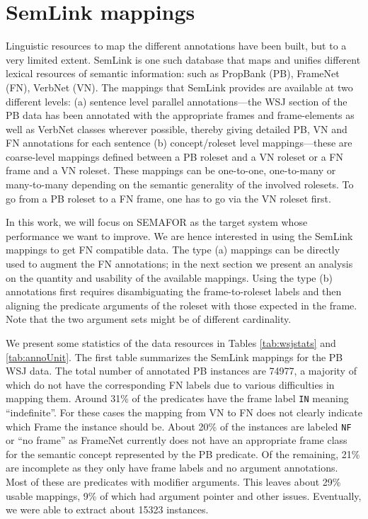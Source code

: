 \documentclass[11pt]{article}
\begin{document}
\section{SemLink mappings}\label{sec:semlink}

Linguistic resources to map the different annotations have been built, but to a very limited extent. SemLink \citep{semlink} is one such database that maps and unifies different lexical resources of semantic information: such as PropBank (PB), FrameNet (FN), VerbNet (VN). The mappings that SemLink provides are available at two different levels: (a) sentence level parallel annotations---the WSJ section of the PB data has been annotated with the appropriate frames and frame-elements as well as VerbNet classes wherever possible, thereby giving detailed PB, VN and FN annotations for each sentence (b) concept/roleset level mappings---these are coarse-level mappings defined between a PB roleset and a VN roleset or a FN frame and a VN roleset. These mappings can be one-to-one, one-to-many or many-to-many depending on the semantic generality of the involved rolesets. To go from a PB roleset to a FN frame, one has to go via the VN roleset first.

In this work, we will focus on SEMAFOR as the target system whose performance we want to improve. We are hence interested in using the SemLink mappings to get FN compatible data. The type (a) mappings can be directly used to augment the FN annotations; in the next section we present an analysis on the quantity and usability of the available mappings. Using the type (b) annotations first requires disambiguating the frame-to-roleset labels and then aligning the predicate arguments of the roleset with those expected in the frame. Note that the two argument sets might be of different cardinality.


We present some statistics of the data resources in Tables \ref{tab:wsjstats} and \ref{tab:annoUnit}. The first table summarizes the SemLink mappings for the PB WSJ data. The total number of annotated PB instances are 74977, a majority of which do not have the corresponding FN labels due to various difficulties in mapping them. Around 31\% of the predicates have the frame label \texttt{IN} meaning ``indefinite''. For these cases the mapping from VN to FN does not clearly indicate which Frame the instance should be. About 20\% of the instances are labeled \texttt{NF} or ``no frame'' as FrameNet currently does not have an appropriate frame class for the semantic concept represented by the PB predicate. Of the remaining, 21\% are incomplete as they only have frame labels and no argument annotations. Most of these are predicates with modifier arguments. This leaves about 29\% usable mappings, 9\% of which had argument pointer and other issues. Eventually, we were able to extract about 15323 instances.
\end{document}

